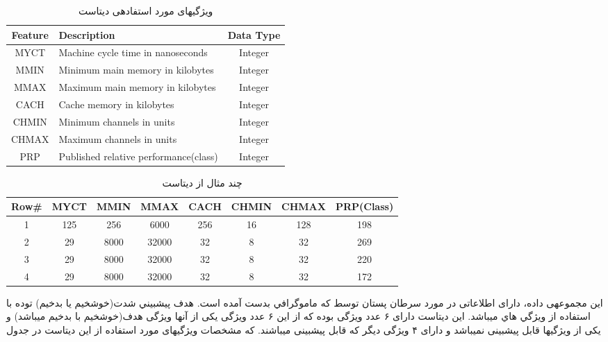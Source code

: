 \documentclass[journal]{IEEEtran}
\newcommand{\نیمفاصله}{\halfspace}
\renewcommand{\ }{\halfspace}
\renewcommand{\یا}{یادگیری\ ارجحیت }
\newcommand{\یم}{یادگیری\ ماشین }
\renewcommand{\تر}{تابع رتبه\ بند }
\newcommand{\ار}{ارجحیت }
\renewcommand{\|}[1][.3em]{\hspace{#1}|\hspace{#1}}
\renewcommand{\,}[1][.3em]{,\hspace{#1}}
\begin{document}
\begin{table}[hb]
    \begin{latin}
    \begin{adjustwidth}{-.in}{0in}
    \centering
    \begin{tabular}{clc}
        \hline
        Feature & Description & Data Type\\\hline
        MYCT   & Machine cycle time in nanoseconds         & Integer\\
        MMIN   & Minimum main memory in kilobytes          & Integer\\
        MMAX   & Maximum main memory in kilobytes          & Integer\\
        CACH   & Cache memory in kilobytes                 & Integer\\
        CHMIN  & Minimum channels in units                 & Integer\\
        CHMAX  & Maximum channels in units                 & Integer\\
        PRP    & Published relative performance(class)     & Integer\\\hline
    \end{tabular}
    \end{adjustwidth}
    \end{latin}
    \caption{ویژگی\ های مورد استفاده\ ی دیتاست }\label{TAB:DATASETS_CPU_DESC}
\end{table}
\begin{table}[hb]
    \begin{latin}
    \begin{adjustwidth}{-.in}{0in}
    \centering
    \begin{tabular}{cccccccc}
        \hline
        Row\# & MYCT & MMIN & MMAX & CACH & CHMIN & CHMAX & PRP(Class)\\\hline
		1 & 125 & 256  & 6000  & 256 & 16 & 128 & 198\\
		2 & 29  & 8000 & 32000 & 32  & 8  & 32  & 269\\
		3 & 29  & 8000 & 32000 & 32  & 8  & 32  & 220\\
		4 & 29  & 8000 & 32000 & 32  & 8  & 32  & 172\\\hline
    \end{tabular}
    \end{adjustwidth}
    \end{latin}
    \caption{چند مثال از دیتاست }\label{TAB:DATASETS_CPU_DATA}
\end{table}
اين مجموعه\ ی داده، دارای اطلاعاتی در مورد سرطان پستان توسط که ماموگرافي بدست آمده است. هدف پيش\ بيني شدت(خوش\ خيم يا بدخيم) توده با استفاده از ويژگي هاي  می\ باشد. این دیتاست دارای ۶ عدد ویژگی بوده که از این ۶ عدد ویژگی یکی از آن\ ها ویژگی هدف(خوش\ خیم با بدخیم می\ باشد) و یکی از ویژگی\ ها قابل پیش\ بینی نمی\ باشد و دارای ۴ ویژگی دیگر که قابل پیش\ بینی می\ باشند. که مشخصات ویژگی\ های مورد استفاده از این دیتاست در جدول
\end{document}
